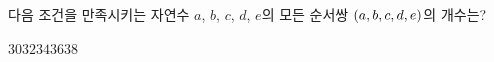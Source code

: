 다음 조건을 만족시키는 자연수 $a$, $b$, $c$, $d$, $e$의 모든 순서쌍 $(a{,}\mkern3mu\mathopen{}b{,}\mkern3mu\mathopen{}c{,}\mkern3mu\mathopen{}d{,}\mkern3mu\mathopen{}e)$의 개수는? 
\begin{choices32}{$30$}{$32$}{$34$}{$36$}{$38$}\end{choices32}
